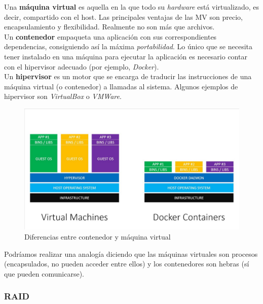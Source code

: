 \documentclass[12pt,spanish]{article}
\begin{document}
Una \textbf{máquina virtual} es aquella en la que todo su \textit{hardware} está virtualizado, es decir, compartido con el host. Las principales ventajas de las MV son precio, encapsulamiento y flexibilidad. Realmente no son más que archivos.\\

Un \textbf{contenedor} empaqueta una aplicación con sus correspondientes dependencias, consiguiendo así la máxima \textit{portabilidad}. Lo único que se necesita tener instalado en una máquina para ejecutar la aplicación es necesario contar con el hipervisor adecuado (por ejemplo, \textit{Docker}).\\

Un \textbf{hipervisor} es un motor que se encarga de traducir las instrucciones de una máquina virtual (o contenedor) a llamadas al sistema. Algunos ejemplos de hipervisor son \textit{VirtualBox} o \textit{VMWare}.

\begin{figure}[H]
  \centering
  \includegraphics[width=\textwidth]{contenedor_vs_vm.jpeg}
  \caption{Diferencias entre contenedor y máquina virtual}
\end{figure}
Podríamos realizar una analogía diciendo que las máquinas virtuales son procesos (encapsulados, no pueden acceder entre ellos) y los contenedores son hebras (sí que pueden comunicarse).

\subsubsection{RAID}
\end{document}
